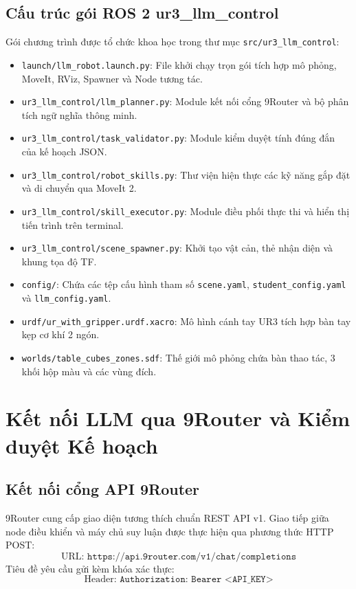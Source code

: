 \documentclass[a4paper,12pt]{article}
\begin{document}
\subsection{Cấu trúc gói ROS 2 ur3\_llm\_control}
Gói chương trình được tổ chức khoa học trong thư mục \texttt{src/ur3\_llm\_control}:
\begin{itemize}[noitemsep]
    \item \texttt{launch/llm\_robot.launch.py}: File khởi chạy trọn gói tích hợp mô phỏng, MoveIt, RViz, Spawner và Node tương tác.
    \item \texttt{ur3\_llm\_control/llm\_planner.py}: Module kết nối cổng 9Router và bộ phân tích ngữ nghĩa thông minh.
    \item \texttt{ur3\_llm\_control/task\_validator.py}: Module kiểm duyệt tính đúng đắn của kế hoạch JSON.
    \item \texttt{ur3\_llm\_control/robot\_skills.py}: Thư viện hiện thực các kỹ năng gắp đặt và di chuyển qua MoveIt 2.
    \item \texttt{ur3\_llm\_control/skill_executor.py}: Module điều phối thực thi và hiển thị tiến trình trên terminal.
    \item \texttt{ur3\_llm\_control/scene_spawner.py}: Khởi tạo vật cản, thẻ nhận diện và khung tọa độ TF.
    \item \texttt{config/}: Chứa các tệp cấu hình tham số \texttt{scene.yaml}, \texttt{student_config.yaml} và \texttt{llm_config.yaml}.
    \item \texttt{urdf/ur_with_gripper.urdf.xacro}: Mô hình cánh tay UR3 tích hợp bàn tay kẹp cơ khí 2 ngón.
    \item \texttt{worlds/table_cubes_zones.sdf}: Thế giới mô phỏng chứa bàn thao tác, 3 khối hộp màu và các vùng đích.
\end{itemize}

\section{Kết nối LLM qua 9Router và Kiểm duyệt Kế hoạch}

\subsection{Kết nối cổng API 9Router}
9Router cung cấp giao diện tương thích chuẩn REST API v1. Giao tiếp giữa node điều khiển và máy chủ suy luận được thực hiện qua phương thức HTTP POST:
\begin{equation}
\text{URL: } \texttt{https://api.9router.com/v1/chat/completions}
\end{equation}
Tiêu đề yêu cầu gửi kèm khóa xác thực:
\begin{equation}
\text{Header: } \texttt{Authorization: Bearer <API\_KEY>}
\end{equation}
\end{document}
